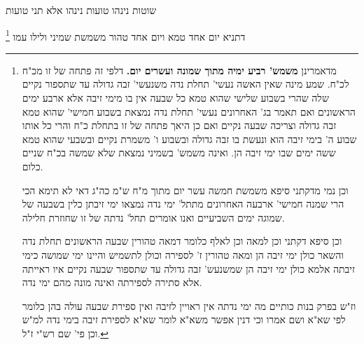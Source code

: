 \documentclass[12pt, openany]{book}
\newcommand{\sethebfont}{
\fontsize{10.5pt}{21.0pt} \selectfont
}
\newcommand{\twocol}[1]{
	{\sethebfont \begin{multicols}{2}
			#1
	\end{multicols}}	
}
\newcommand{\footnotecomment}[1]{
	\renewcommand\thefootnote{}
	\footnote{#1}}
\newcommand{\commenta}[1]{\footnotecomment{#1}}
\begin{document}
\twocol{שוטות נינהו טועות נינהו אלא תני טועות 
\commenta{מדאמרינן \textbf{משמש' רביע ימיה מתוך שמונה ועשרים יום.} דלפי זה פתחה של זו מכ"ח לכ"ח. שמע מינה שאין האשה נעשי' תחלת נדה משנעשי' זבה גדולה עד שתספור נקיים שלה שהרי בשבוע שלישי שהוא טמא כל שבעה אין בו מימי זיבה אלא ארבע ימים הראשונים ואם תאמר בג' האחרונים נעשי' תחלת נדה נמצאת בשבוע חמישי' שהוא טמא זבה גדולה וצריכה שבעה נקיים ואם כן היאך פתחה של זו בתחלת כ"ח והרי כל אותו שבוע ה' בימי זיבה הוא ונעשת בו זבה גדולה ובשבוע ו' משמרת נקיים ובשבעי שהוא טמא ששה ימים שבו ימי זיבה הן. ואינה משמש' בשמיני נמצאת שלא שמשה בכ"ח שניים כלום.\par וכן נמי מדקתני סיפא משמשת חמשה עשר יום מתוך מ"ח ש"מ כה"ג דאי לא תימא הכי הרי שמנה חמישי' ארבעה האחרונים מתתל' ימי נדה נמצאו ימי זיבתן כלין בשבעה של שמוגה ימים השביעיים ואנו אומרים תחל' נדתה של זו שחוזרת חלילה.\par וכן סיפא דקתני וכן למאה וכן לאלף כלומר דמאה טהורין שבעה הראשונים תחלת נדה והשאר כולן ימי זיבה הן ומאה טהורין ז' לספירה וכולן לתשמיש והיינו ימי שמושה כימי זיבתה אלמא כולן ימי זיבה הן שמשנעש' זבה גדולה עד שתספור שבעה נקיים איו ראייתה אלא סתירה לספירתה ואינה מונה מהם ימי נדה.\par וז"ש בפרק בנות כותיים מה ימי נדתה אין ראויין לזיבה ואין ספירת שבעה עולה בהן כלומר לפי שא"א ושם אמרו וכי דנין אפשר משא"א לומר שא"א לספירת זיבה בימי נדה למ"ש וכן פי' שם רש"י ז"ל. }
דתניא יום אחד טמא ויום אחד טהור משמשת שמיני ולילו עמו
}
\end{document}
